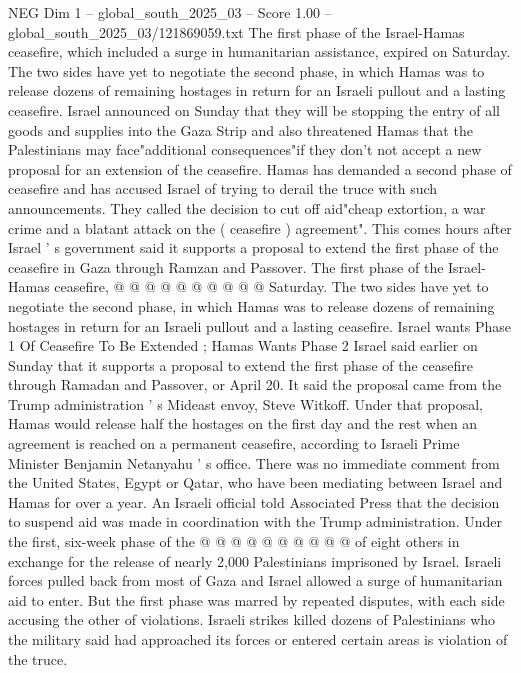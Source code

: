 \begin{textsample}{NEG Dim 1 – global\_south\_2025\_03 – Score 1.00 – global\_south\_2025\_03/121869059.txt}  \label{ex:f1_neg_163}
The first phase of the Israel-Hamas ceasefire, which included a surge in humanitarian assistance, expired on Saturday.
The two sides have yet to negotiate the second phase, in which Hamas was to release dozens of remaining hostages in return for an Israeli pullout and a lasting ceasefire.
Israel announced on Sunday that they will be stopping the entry of all goods and supplies into the Gaza Strip and also threatened Hamas that the Palestinians may face"additional consequences"if they don't not accept a new proposal for an extension of the ceasefire.
Hamas has demanded a second phase of ceasefire and has accused Israel of trying to derail the truce with such announcements.
They called the decision to cut off aid"cheap extortion, a war crime and a blatant attack on the ( ceasefire ) agreement".
This comes hours after Israel ' s government said it supports a proposal to extend the first phase of the ceasefire in Gaza through Ramzan and Passover.
The first phase of the Israel-Hamas ceasefire, @ @ @ @ @ @ @ @ @ @ Saturday.
The two sides have yet to negotiate the second phase, in which Hamas was to release dozens of remaining hostages in return for an Israeli pullout and a lasting ceasefire.
Israel wants Phase 1 Of Ceasefire To Be Extended ; Hamas Wants Phase 2 Israel said earlier on Sunday that it supports a proposal to extend the first phase of the ceasefire through Ramadan and Passover, or April 20.
It said the proposal came from the Trump administration ' s Mideast envoy, Steve Witkoff.
Under that proposal, Hamas would release half the hostages on the first day and the rest when an agreement is reached on a permanent ceasefire, according to Israeli Prime Minister Benjamin Netanyahu ' s office.
There was no immediate comment from the United States, Egypt or Qatar, who have been mediating between Israel and Hamas for over a year.
An Israeli official told Associated Press that the decision to suspend aid was made in coordination with the Trump administration.
Under the first, six-week phase of the @ @ @ @ @ @ @ @ @ @ of eight others in exchange for the release of nearly 2,000 Palestinians imprisoned by Israel.
Israeli forces pulled back from most of Gaza and Israel allowed a surge of humanitarian aid to enter.
But the first phase was marred by repeated disputes, with each side accusing the other of violations.
Israeli strikes killed dozens of Palestinians who the military said had approached its forces or entered certain areas is violation of the truce.

\end{textsample}

